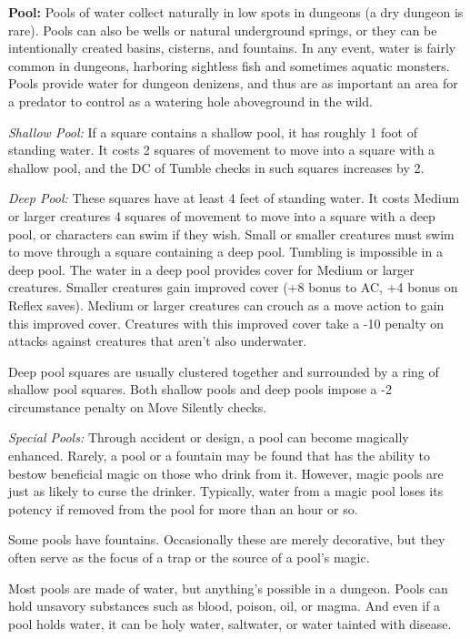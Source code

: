 \textbf{Pool:} Pools of water collect naturally in low spots in dungeons (a dry 
dungeon is rare). Pools can also be wells or natural underground springs, or they 
can be intentionally created basins, cisterns, and fountains. In any event, water 
is fairly common in dungeons, harboring sightless fish and sometimes aquatic monsters. 
Pools provide water for dungeon denizens, and thus are as important an area for 
a predator to control as a watering hole aboveground in the wild.

\textit{Shallow Pool:} If a square contains a shallow pool, it has roughly 1 foot 
of standing water. It costs 2 squares of movement to move into a square with a 
shallow pool, and the DC of Tumble checks in such squares increases by 2.

\textit{Deep Pool:} These squares have at least 4 feet of standing water. It costs 
Medium or larger creatures 4 squares of movement to move into a square with a deep 
pool, or characters can swim if they wish. Small or smaller creatures must swim 
to move through a square containing a deep pool. Tumbling is impossible in a deep 
pool. The water in a deep pool provides cover for Medium or larger creatures. Smaller 
creatures gain improved cover (+8 bonus to AC, +4 bonus on Reflex saves). Medium 
or larger creatures can crouch as a move action to gain this improved cover. Creatures 
with this improved cover take a -10 penalty on attacks against creatures that aren't 
also underwater. 

Deep pool squares are usually clustered together and surrounded by a ring of shallow 
pool squares. Both shallow pools and deep pools impose a -2 circumstance penalty 
on Move Silently checks.

\textit{Special Pools:} Through accident or design, a pool can become magically 
enhanced. Rarely, a pool or a fountain may be found that has the ability to bestow 
beneficial magic on those who drink from it. However, magic pools are just as likely 
to curse the drinker. Typically, water from a magic pool loses its potency if removed 
from the pool for more than an hour or so.

Some pools have fountains. Occasionally these are merely decorative, but they often 
serve as the focus of a trap or the source of a pool's magic.

Most pools are made of water, but anything's possible in a dungeon. Pools can hold 
unsavory substances such as blood, poison, oil, or magma. And even if a pool holds 
water, it can be holy water, saltwater, or water tainted with disease.

